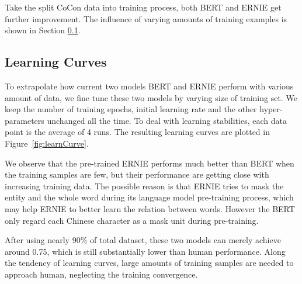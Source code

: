 
Take the split CoCon data into training process, both BERT and ERNIE get further improvement. The influence of varying amounts of training examples is shown in Section \ref{subsec:lr-curve}. %



\subsection{Learning Curves}
\label{subsec:lr-curve}


To extrapolate how current two models BERT and ERNIE perform with various amount of data, we fine tune these two models by varying size of training set. We keep the number of training epochs, initial learning rate and the other hyper-parameters unchanged all the time. To deal with learning stabilities, each data point is the average of 4 runs. The resulting learning curves are plotted in Figure~\ref{fig:learnCurve}. 

We observe that the pre-trained ERNIE performs much better than BERT when the training samples are few, but their performance are getting close with increasing training data. 
The possible reason is that ERNIE tries to mask the entity and the whole word during its language model pre-training process, which may help ERNIE to better learn the relation between words. However the BERT only regard each Chinese character as a mask unit during pre-training. 


After using nearly 90\% of total dataset, these two models can merely achieve around 0.75, which is still substantially lower than human performance. Along the tendency of learning curves, large amounts of training samples are needed to approach human, neglecting the training convergence.


